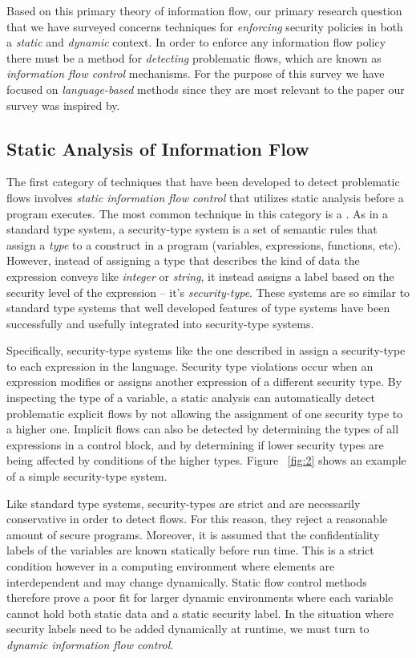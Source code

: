 \documentclass[preprint]{sigplanconf}
\begin{document}
Based on this primary theory of information flow, our primary research question that we have surveyed concerns techniques for \textit{enforcing} security policies in both a \textit{static} and \textit{dynamic} context. In order to enforce any information flow policy there must be a method for \textit{detecting} problematic flows, which are known as \textit{information flow control} mechanisms. For the purpose of this survey we have focused on \textit{language-based} methods since they are most relevant to the paper our survey was inspired by.

\subsection*{Static Analysis of Information Flow}
\label{sec:2.2}

The first category of techniques that have been developed to detect problematic flows involves \textit{static information flow control} that utilizes static analysis before a program executes. The most common technique in this category is a . As in a standard type system, a security-type system is a set of semantic rules that assign a \textit{type} to a construct in a program (variables, expressions, functions, etc). However, instead of assigning a type that describes the kind of data the expression conveys like \textit{integer} or \textit{string}, it instead assigns a label based on the security level of the expression -- it's \textit{security-type}. These systems are so similar to standard type systems that well developed features of type systems have been successfully and usefully integrated into security-type systems.

Specifically, security-type systems like the one described in \cite{sabelfeld2003language} assign a security-type to each expression in the language. Security type violations occur when an expression modifies or assigns another expression of a different security type. By inspecting the type of a variable, a static analysis can automatically detect problematic explicit flows by not allowing the assignment of one security type to a higher one. Implicit flows can also be detected by determining the types of all expressions in a control block, and by determining if lower security types are being affected by conditions of the higher types. Figure ~\ref{fig:2} shows an example of a simple security-type system.

Like standard type systems, security-types are strict and are necessarily conservative in order to detect flows. For this reason, they reject a reasonable amount of secure programs. Moreover, it is assumed that the confidentiality labels of the variables are known statically before run time. This is a strict condition however in a computing environment where elements are interdependent and may change dynamically. Static flow control methods therefore prove a poor fit for larger dynamic environments where each variable cannot hold both static data and a static security label. In the situation where security labels need to be added dynamically at runtime, we must turn to \textit{dynamic information flow control}.
\end{document}

